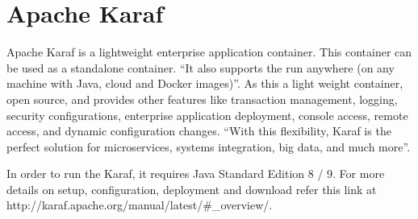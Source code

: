 \section{Apache Karaf}

Apache Karaf is a lightweight enterprise application container. This container can be used as a standalone container. “It also supports the run anywhere (on any machine with Java, cloud and Docker images)”\cite{hid-sp18-514-apachekaraf}. 
As this a light weight container, open source, and provides other features like transaction management\cite{karaf_transaction}, logging, security configurations, enterprise application deployment, 
console access, remote access, and dynamic configuration changes. “With this flexibility, Karaf is the perfect solution for microservices, systems integration, big data, 
and much more”\cite{hid-sp18-514-apachekaraf}.

In order to run the Karaf, it requires Java Standard Edition 8 / 9. For more details on setup, configuration, deployment and download refer this link at http://karaf.apache.org/manual/latest/#_overview/.

